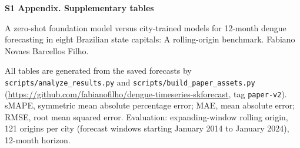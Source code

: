 \documentclass[10pt,letterpaper]{article}
\begin{document}
\raggedright
{\large \textbf{S1 Appendix. Supplementary tables}}

\medskip
A zero-shot foundation model versus city-trained models for 12-month dengue forecasting in eight Brazilian state capitals: A rolling-origin benchmark. Fabiano Novaes Barcellos Filho.

\medskip
All tables are generated from the saved forecasts by \texttt{scripts/analyze\_results.py} and \texttt{scripts/build\_paper\_assets.py} (\url{https://github.com/fabianofilho/dengue-timeseries-skforecast}, tag \texttt{paper-v2}). sMAPE, symmetric mean absolute percentage error; MAE, mean absolute error; RMSE, root mean squared error. Evaluation: expanding-window rolling origin, 121 origins per city (forecast windows starting January 2014 to January 2024), 12-month horizon.

\begin{landscape}

\end{landscape}









\clearpage

\end{document}
